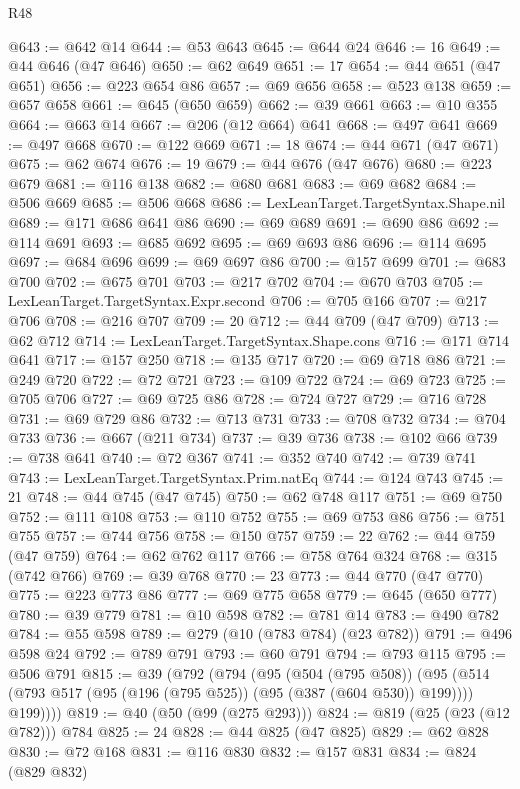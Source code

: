 \begin{lexlean}{R48}
\begin{coremodule}
@643 := @642 @14
@644 := @53 @643
@645 := @644 @24
@646 := 16
@649 := @44 @646 (@47 @646)
@650 := @62 @649
@651 := 17
@654 := @44 @651 (@47 @651)
@656 := @223 @654 @86
@657 := @69 @656
@658 := @523 @138
@659 := @657 @658
@661 := @645 (@650 @659)
@662 := @39 @661
@663 := @10 @355
@664 := @663 @14
@667 := @206 (@12 @664) @641
@668 := @497 @641
@669 := @497 @668
@670 := @122 @669
@671 := 18
@674 := @44 @671 (@47 @671)
@675 := @62 @674
@676 := 19
@679 := @44 @676 (@47 @676)
@680 := @223 @679
@681 := @116 @138
@682 := @680 @681
@683 := @69 @682
@684 := @506 @669
@685 := @506 @668
@686 := LexLeanTarget.TargetSyntax.Shape.nil
@689 := @171 @686 @641 @86
@690 := @69 @689
@691 := @690 @86
@692 := @114 @691
@693 := @685 @692
@695 := @69 @693 @86
@696 := @114 @695
@697 := @684 @696
@699 := @69 @697 @86
@700 := @157 @699
@701 := @683 @700
@702 := @675 @701
@703 := @217 @702
@704 := @670 @703
@705 := LexLeanTarget.TargetSyntax.Expr.second
@706 := @705 @166
@707 := @217 @706
@708 := @216 @707
@709 := 20
@712 := @44 @709 (@47 @709)
@713 := @62 @712
@714 := LexLeanTarget.TargetSyntax.Shape.cons
@716 := @171 @714 @641
@717 := @157 @250
@718 := @135 @717
@720 := @69 @718 @86
@721 := @249 @720
@722 := @72 @721
@723 := @109 @722
@724 := @69 @723
@725 := @705 @706
@727 := @69 @725 @86
@728 := @724 @727
@729 := @716 @728
@731 := @69 @729 @86
@732 := @713 @731
@733 := @708 @732
@734 := @704 @733
@736 := @667 (@211 @734)
@737 := @39 @736
@738 := @102 @66
@739 := @738 @641
@740 := @72 @367
@741 := @352 @740
@742 := @739 @741
@743 := LexLeanTarget.TargetSyntax.Prim.natEq
@744 := @124 @743
@745 := 21
@748 := @44 @745 (@47 @745)
@750 := @62 @748 @117
@751 := @69 @750
@752 := @111 @108
@753 := @110 @752
@755 := @69 @753 @86
@756 := @751 @755
@757 := @744 @756
@758 := @150 @757
@759 := 22
@762 := @44 @759 (@47 @759)
@764 := @62 @762 @117
@766 := @758 @764 @324
@768 := @315 (@742 @766)
@769 := @39 @768
@770 := 23
@773 := @44 @770 (@47 @770)
@775 := @223 @773 @86
@777 := @69 @775 @658
@779 := @645 (@650 @777)
@780 := @39 @779
@781 := @10 @598
@782 := @781 @14
@783 := @490 @782
@784 := @55 @598
@789 := @279 (@10 (@783 @784) (@23 @782))
@791 := @496 @598 @24
@792 := @789 @791
@793 := @60 @791
@794 := @793 @115
@795 := @506 @791
@815 := @39
    (@792
      (@794
        (@95
          (@504 (@795 @508))
          (@95 (@514 (@793 @517 (@95 (@196 (@795 @525)) (@95 (@387 (@604 @530)) @199)))) @199))))
@819 := @40 (@50 (@99 (@275 @293)))
@824 := @819 (@25 (@23 (@12 @782))) @784
@825 := 24
@828 := @44 @825 (@47 @825)
@829 := @62 @828
@830 := @72 @168
@831 := @116 @830
@832 := @157 @831
@834 := @824 (@829 @832)

\end{coremodule}
\end{lexlean}
